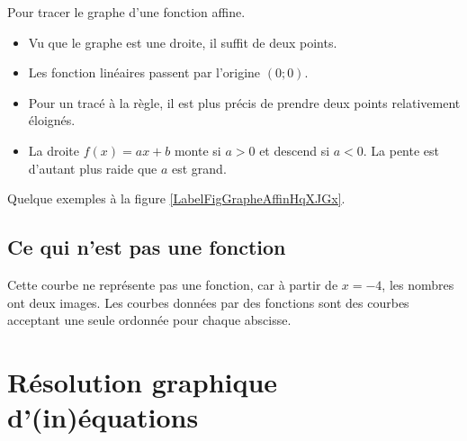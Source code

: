 Pour tracer le graphe d'une fonction affine.
\begin{itemize}
    \item
        Vu que le graphe est une droite, il suffit de deux points.
    \item
        Les fonction linéaires passent par l'origine \( (0;0)\).
    \item 
        Pour un tracé à la règle, il est plus précis de prendre deux points relativement éloignés.
    \item
        La droite \( f(x)=ax+b\) monte si \( a>0\) et descend si \( a<0\). La pente est d'autant plus raide que \( a\) est grand.
\end{itemize}

Quelque exemples à la figure \ref{LabelFigGrapheAffinHqXJGx}.
\newcommand{\CaptionFigGrapheAffinHqXJGx}{Des graphes de fonctions linéaires et affines.}


\subsection{Ce qui n'est pas une fonction}


\begin{multicols}{2}
    Cette courbe ne représente pas une fonction, car à partir de \( x=-4\), les nombres ont deux images. Les courbes données par des fonctions sont des courbes acceptant une seule ordonnée pour chaque abscisse.

\columnbreak




\end{multicols}

\section{Résolution graphique d'(in)équations} 

